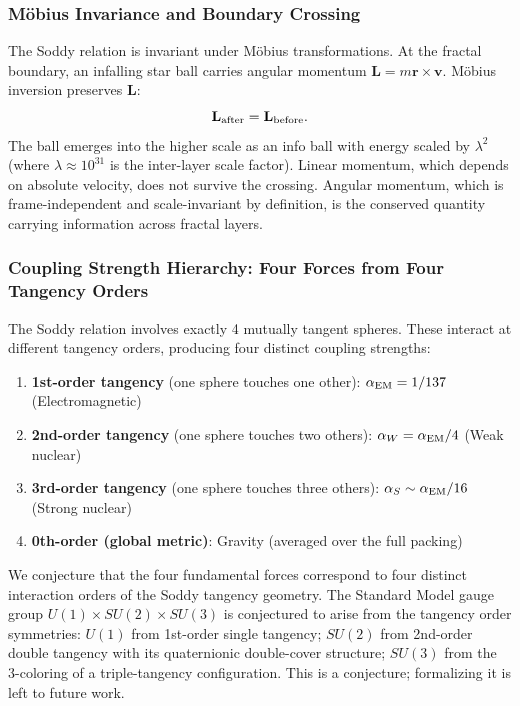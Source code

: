 \documentclass[11pt,a4paper]{article}
\begin{document}
\subsubsection{Möbius Invariance and Boundary Crossing}

The Soddy relation is invariant under Möbius transformations. At the fractal boundary, an infalling star ball carries angular momentum $\mathbf{L} = m\mathbf{r}\times\mathbf{v}$. Möbius inversion preserves $\mathbf{L}$:
\[
\mathbf{L}_{\rm after} = \mathbf{L}_{\rm before}.
\]
The ball emerges into the higher scale as an info ball with energy scaled by $\lambda^2$ (where $\lambda \approx 10^{31}$ is the inter-layer scale factor). Linear momentum, which depends on absolute velocity, does not survive the crossing. Angular momentum, which is frame-independent and scale-invariant by definition, is the conserved quantity carrying information across fractal layers.

\subsubsection{Coupling Strength Hierarchy: Four Forces from Four Tangency Orders}

The Soddy relation involves exactly 4 mutually tangent spheres. These interact at different tangency orders, producing four distinct coupling strengths:
\begin{enumerate}
  \item \textbf{1st-order tangency} (one sphere touches one other): $\alpha_{\rm EM} = 1/137$ (Electromagnetic)
  \item \textbf{2nd-order tangency} (one sphere touches two others): $\alpha_W = \alpha_{\rm EM}/4$ (Weak nuclear)
  \item \textbf{3rd-order tangency} (one sphere touches three others): $\alpha_S \sim \alpha_{\rm EM}/16$ (Strong nuclear)
  \item \textbf{0th-order (global metric)}: Gravity (averaged over the full packing)
\end{enumerate}

We conjecture that the four fundamental forces correspond to four distinct interaction orders of the Soddy tangency geometry. The Standard Model gauge group $U(1) \times SU(2) \times SU(3)$ is conjectured to arise from the tangency order symmetries: $U(1)$ from 1st-order single tangency; $SU(2)$ from 2nd-order double tangency with its quaternionic double-cover structure; $SU(3)$ from the 3-coloring of a triple-tangency configuration. This is a conjecture; formalizing it is left to future work.
\end{document}
